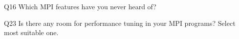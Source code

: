 \begin{description}%
\item{Q16} Which MPI features have you never heard of?%
\item{Q23} Is there any room for performance tuning in your MPI programs? Select most suitable one.%
\end{description}%
